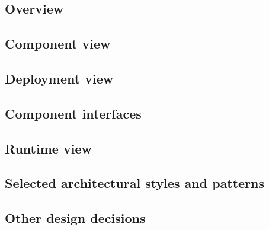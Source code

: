 \subsection{Overview}
\subsection{Component view}
\subsection{Deployment view}
\subsection{Component interfaces}
\subsection{Runtime view}
\subsection{Selected architectural styles and patterns}
\subsection{Other design decisions}
